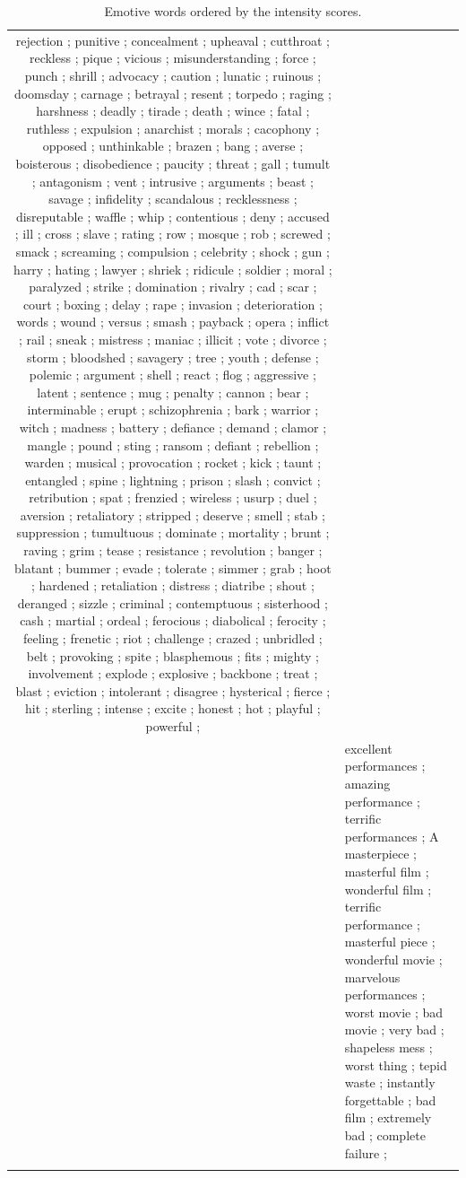 \documentclass[11pt]{article}
\begin{document}
\begin{table}[th]
\begin{center}
\begin{tabular}{c @{\hspace{0pt}}  @{\hspace{15pt}}p{}}
rejection	;
punitive	;
concealment	;
upheaval	;
cutthroat	;
reckless	;
pique	;
vicious	;
misunderstanding	;
force	;
punch	;
shrill	;
advocacy	;
caution	;
lunatic	;
ruinous	;
doomsday	;
carnage	;
betrayal	;
resent	;
torpedo	;
raging	;
harshness	;
deadly	;
tirade	;
death	;
wince	;
fatal	;
ruthless	;
expulsion	;
anarchist	;
morals	;
cacophony	;
opposed	;
unthinkable	;
brazen	;
bang	;
averse	;
boisterous	;
disobedience	;
paucity	;
threat	;
gall	;
tumult	;
antagonism	;
vent	;
intrusive	;
arguments	;
beast	;
savage	;
infidelity	;
scandalous	;
recklessness	;
disreputable	;
waffle	;
whip	;
contentious	;
deny	;
accused	;
ill	;
cross	;
slave	;
rating	;
row	;
mosque	;
rob	;
screwed	;
smack	;
screaming	;
compulsion	;
celebrity	;
shock	;
gun	;
harry	;
hating	;
lawyer	;
shriek	;
ridicule	;
soldier	;
moral	;
paralyzed	;
strike	;
domination	;
rivalry	;
cad	;
scar	;
court	;
boxing	;
delay	;
rape	;
invasion	;
deterioration	;
words	;
wound	;
versus	;
smash	;
payback	;
opera	;
inflict	;
rail	;
sneak	;
mistress	;
maniac	;
illicit	;
vote	;
divorce	;
storm	;
bloodshed	;
savagery	;
tree	;
youth	;
defense	;
polemic	;
argument	;
shell	;
react	;
flog	;
aggressive	;
latent	;
sentence	;
mug	;
penalty	;
cannon	;
bear	;
interminable	;
erupt	;
schizophrenia	;
bark	;
warrior	;
witch	;
madness	;
battery	;
defiance	;
demand	;
clamor	;
mangle	;
pound	;
sting	;
ransom	;
defiant	;
rebellion	;
warden	;
musical	;
provocation	;
rocket	;
kick	;
taunt	;
entangled	;
spine	;
lightning	;
prison	;
slash	;
convict	;
retribution	;
spat	;
frenzied	;
wireless	;
usurp	;
duel	;
aversion	;
retaliatory	;
stripped	;
deserve	;
smell	;
stab	;
suppression	;
tumultuous	;
dominate	;
mortality	;
brunt	;
raving	;
grim	;
tease	;
resistance	;
revolution	;
banger	;
blatant	;
bummer	;
evade	;
tolerate	;
simmer	;
grab	;
hoot	;
hardened	;
retaliation	;
distress	;
diatribe	;
shout	;
deranged	;
sizzle	;
criminal	;
contemptuous	;
sisterhood	;
cash	;
martial	;
ordeal	;
ferocious	;
diabolical	;
ferocity	;
feeling	;
frenetic	;
riot	;
challenge	;
crazed	;
unbridled	;
belt	;
provoking	;
spite	;
blasphemous	;
fits	;
mighty	;
involvement	;
explode	;
explosive	;
backbone	;
treat	;
blast	;
eviction	;
intolerant	;
disagree	;
hysterical	;
fierce	;
hit	;
sterling	;
intense	;
excite	;
honest	;
hot	;
playful	;
powerful	;


\\ \addlinespace
2 &
excellent performances ; 
amazing performance ; 
terrific performances ; 
A masterpiece ; 
masterful film ; 
wonderful film ; 
terrific performance ; 
masterful piece ; 
wonderful movie ; 
marvelous performances ; 
worst movie ; 
bad movie ; 
very bad ; 
shapeless mess ; 
worst thing ; 
tepid waste ; 
instantly forgettable ; 
bad film ; 
extremely bad ; 
complete failure ; 


\\\addlinespace\bottomrule[.12em]
\end{tabular}
\caption{Emotive words ordered by the intensity scores.}
\label{table:exPolarity}
\vspace{.4cm}
\end{center}
\end{table}
\end{document}
